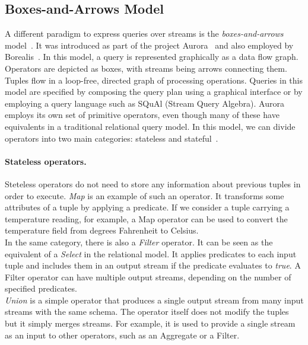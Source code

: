 \subsection*{Boxes-and-Arrows Model}
\label{boxes_and_arrows}
A different paradigm to express queries over streams is the
\emph{boxes-and-arrows} model~\cite{boxes-and-arrows}.
It was introduced as part of the project Aurora~\cite{aurora-and-medusa} and also employed by
Borealis~\cite{borealis-design}.
In this model, a query is represented graphically as a data flow graph. Operators are depicted as boxes,
with streams being arrows connecting them. Tuples flow in a loop-free, directed graph of processing
operations. Queries in this model are specified by composing the query plan using a graphical interface
or by employing a query language such as SQuAl (Stream Query Algebra).
Aurora employs its own set of primitive operators, even though many of these have equivalents in a
traditional relational query model.
In this model, we can divide operators into two main categories: stateless and
stateful~\cite{borealis-app-manual}.
\paragraph{Stateless operators.} Steteless operators do not need to store any information about previous
tuples in order to execute.
\emph{Map} is an example of such an operator. It transforms some attributes of a tuple by applying a
predicate. If we consider a tuple carrying a temperature reading, for example, a Map operator can be
used to convert the temperature field from degrees Fahrenheit to Celsius.\\
In the same category, there is also a \emph{Filter} operator. It can be seen as the equivalent of a
\emph{Select} in the relational model.
It applies predicates to each input tuple and includes them in an output stream if the predicate evaluates to \emph{true}.
A Filter operator can have multiple output streams, depending on the number of specified predicates. \\
\emph{Union} is a simple operator that produces a single output stream from many input streams with the
same schema. The operator itself does not modify the tuples but it simply merges
streams. For example, it is used to provide a single stream as an input to other
operators, such as an Aggregate or a Filter.


